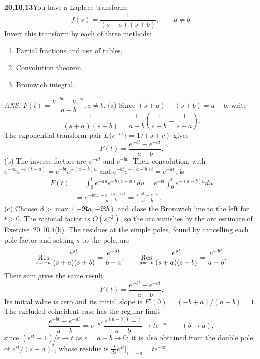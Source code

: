 \par\bigskip
\noindent\textbf{20.10.13}\quad You have a Laplace transform:
\[
f(s)=\frac{1}{(s+a)(s+b)},\qquad a\ne b.
\]
Invert this transform by each of three methods:
\begin{enumerate}
\item[(a)] Partial fractions and use of tables,
\item[(b)] Convolution theorem,
\item[(c)] Bromwich integral.
\end{enumerate}
\par\nobreak\hfill\emph{ANS.}\enspace
$F(t)=\dfrac{e^{-bt}-e^{-at}}{a-b}$,\quad$a\ne b$.
\solution
(a) Since $(s+a)-(s+b)=a-b$, write
\[
\frac1{(s+a)(s+b)}
=\frac1{a-b}\left(\frac1{s+b}-\frac1{s+a}\right).
\]
The exponential transform pair $L\{e^{-ct}\}=1/(s+c)$ gives
\[
F(t)=\frac{e^{-bt}-e^{-at}}{a-b}.
\]
(b) The inverse factors are $e^{-at}$ and $e^{-bt}$.
Their convolution, with
$e^{-au}e^{-b(t-u)}=e^{-bt}e^{-(a-b)u}$ and
$e^{-bt}e^{-(a-b)t}=e^{-at}$, is
\begin{align*}
F(t)&=\int_0^t e^{-au}e^{-b(t-u)}du
=e^{-bt}\int_0^t e^{-(a-b)u}du\\
&=e^{-bt}\frac{1-e^{-(a-b)t}}{a-b}
=\frac{e^{-bt}-e^{-at}}{a-b}.
\end{align*}
(c) Choose $\beta>\max(-\Re a,-\Re b)$ and close the
Bromwich line to the left for $t>0$. The rational factor
is $O(s^{-2})$, so the arc vanishes by the arc estimate of
Exercise~20.10.4(b). The residues at the simple poles, found
by cancelling each pole factor and setting $s$ to the pole,
are
\[
\mathop{\rm Res}_{s=-a}\frac{e^{st}}{(s+a)(s+b)}
=\frac{e^{-at}}{b-a},\qquad
\mathop{\rm Res}_{s=-b}\frac{e^{st}}{(s+a)(s+b)}
=\frac{e^{-bt}}{a-b}.
\]
Their sum gives the same result:
\[
\boxed{F(t)=\frac{e^{-bt}-e^{-at}}{a-b}}.
\]
Its initial value is zero and its initial slope is
$F'(0)=(-b+a)/(a-b)=1$.
The excluded coincident case has the regular limit
\[
\frac{e^{-bt}-e^{-at}}{a-b}
=e^{-at}\,\frac{e^{(a-b)t}-1}{a-b}\to te^{-at}
\qquad(b\to a),
\]
since $(e^{\epsilon t}-1)/\epsilon\to t$ as $\epsilon=a-b\to0$;
it is also obtained from the double pole of $e^{st}/(s+a)^2$, whose
residue is $\frac d{ds}e^{st}\big|_{s=-a}=te^{-at}$.
